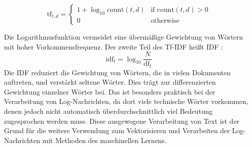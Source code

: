 \begin{equation}
  \text{tf}_{t,d} = 
  \begin{cases} 
    1 + \log_{10} \text{count}(t,d) & \text{if } \text{count}(t,d) > 0 \\
    0 & \text{otherwise}
  \end{cases}
\end{equation}

Die Logarithmusfunktion vermeidet eine übermäßige Gewichtung von Wörtern mit hoher Vorkommensfrequenz. Der zweite Teil des Tf-IDF heißt \ac{IDF} \cite[Kap.~11]{jm3}:
\begin{equation}
  \text{idf}_t = \log_{10} \frac{N}{\text{df}_t}
\end{equation}
Die IDF reduziert die Gewichtung von Wörtern, die in vielen Dokumenten auftreten, und verstärkt seltene Wörter. Dies trägt zur differenzierten Gewichtung einzelner Wörter bei. Das ist besonders praktisch bei der Verarbeitung von Log-Nachrichten, da dort viele technische Wörter vorkommen, denen jedoch nicht automatisch überdurchschnittlich viel Bedeutung zugesprochen werden muss. Diese ausgewogene Verarbeitung von Text ist der Grund für die weitere Verwendung zum Vektorisieren und Verarbeiten der Log-Nachrichten mit Methoden des maschinellen Lernens.

